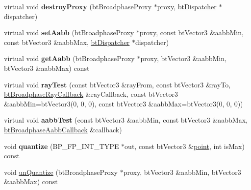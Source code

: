 \begin{DoxyCompactItemize}
\item 
\hypertarget{classbt_axis_sweep3_internal_ad994787298649e89fc55a6d43af65a1e}{virtual void {\bfseries destroy\+Proxy} (bt\+Broadphase\+Proxy $\ast$proxy, \hyperlink{classbt_dispatcher}{bt\+Dispatcher} $\ast$dispatcher)}\label{classbt_axis_sweep3_internal_ad994787298649e89fc55a6d43af65a1e}

\item 
\hypertarget{classbt_axis_sweep3_internal_ab75a4fc28e56239fe76c061f6ee9231c}{virtual void {\bfseries set\+Aabb} (bt\+Broadphase\+Proxy $\ast$proxy, const bt\+Vector3 \&aabb\+Min, const bt\+Vector3 \&aabb\+Max, \hyperlink{classbt_dispatcher}{bt\+Dispatcher} $\ast$dispatcher)}\label{classbt_axis_sweep3_internal_ab75a4fc28e56239fe76c061f6ee9231c}

\item 
\hypertarget{classbt_axis_sweep3_internal_a15e7d910608d4b9aa4effe0ed5256ab3}{virtual void {\bfseries get\+Aabb} (bt\+Broadphase\+Proxy $\ast$proxy, bt\+Vector3 \&aabb\+Min, bt\+Vector3 \&aabb\+Max) const }\label{classbt_axis_sweep3_internal_a15e7d910608d4b9aa4effe0ed5256ab3}

\item 
\hypertarget{classbt_axis_sweep3_internal_a370bc732655b33bf166114afe22fb9e7}{virtual void {\bfseries ray\+Test} (const bt\+Vector3 \&ray\+From, const bt\+Vector3 \&ray\+To, \hyperlink{structbt_broadphase_ray_callback}{bt\+Broadphase\+Ray\+Callback} \&ray\+Callback, const bt\+Vector3 \&aabb\+Min=bt\+Vector3(0, 0, 0), const bt\+Vector3 \&aabb\+Max=bt\+Vector3(0, 0, 0))}\label{classbt_axis_sweep3_internal_a370bc732655b33bf166114afe22fb9e7}

\item 
\hypertarget{classbt_axis_sweep3_internal_ac93d0e99a1f936209fae09406663b9b6}{virtual void {\bfseries aabb\+Test} (const bt\+Vector3 \&aabb\+Min, const bt\+Vector3 \&aabb\+Max, \hyperlink{structbt_broadphase_aabb_callback}{bt\+Broadphase\+Aabb\+Callback} \&callback)}\label{classbt_axis_sweep3_internal_ac93d0e99a1f936209fae09406663b9b6}

\item 
\hypertarget{classbt_axis_sweep3_internal_ae3287432ac3ad100fe46e084b0551780}{void {\bfseries quantize} (B\+P\+\_\+\+F\+P\+\_\+\+I\+N\+T\+\_\+\+T\+Y\+P\+E $\ast$out, const bt\+Vector3 \&\hyperlink{structpoint}{point}, int is\+Max) const }\label{classbt_axis_sweep3_internal_ae3287432ac3ad100fe46e084b0551780}

\item 
\hypertarget{classbt_axis_sweep3_internal_a72c4adb519fe1be273fa767828952e79}{void \hyperlink{classbt_axis_sweep3_internal_a72c4adb519fe1be273fa767828952e79}{un\+Quantize} (bt\+Broadphase\+Proxy $\ast$proxy, bt\+Vector3 \&aabb\+Min, bt\+Vector3 \&aabb\+Max) const }\label{classbt_axis_sweep3_internal_a72c4adb519fe1be273fa767828952e79}


\end{DoxyCompactItemize}

